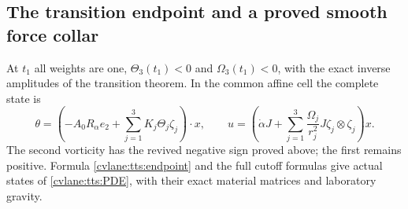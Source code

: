 \subsection{The transition endpoint and a proved smooth force collar}

At $t_1$ all weights are one, $\Theta_3(t_1)<0$ and
$\Omega_3(t_1)<0$, with the exact inverse amplitudes of the
transition theorem. In the common affine cell the complete state is
\begin{equation}\label{cvlane:tts:endpoint}
 \theta=\left(-A_0R_\alpha e_2+
             \sum_{j=1}^3K_j\Theta_j\zeta_j\right)\cdot x,
 \qquad
 u=\left(\dot\alpha J+
    \sum_{j=1}^3\frac{\Omega_j}{r_j^2}
                          J\zeta_j\otimes\zeta_j\right)x.
\end{equation}
The second vorticity has the revived negative sign proved above;
the first remains positive. Formula \eqref{cvlane:tts:endpoint} and the
full cutoff formulas give actual states of \eqref{cvlane:tts:PDE}, with
their exact material matrices and laboratory gravity.

